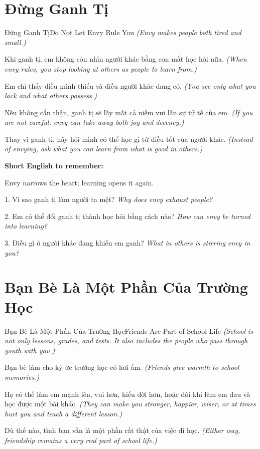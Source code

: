 \section{Đừng Ganh Tị}
\begin{truyen}{Đừng Ganh Tị}{Do Not Let Envy Rule You}
\textit{(Envy makes people both tired and small.)}

Khi ganh tị, em không còn nhìn người khác bằng con mắt học hỏi nữa.
\textit{(When envy rules, you stop looking at others as people to learn from.)}

Em chỉ thấy điều mình thiếu và điều người khác đang có.
\textit{(You see only what you lack and what others possess.)}

Nếu không cẩn thận, ganh tị sẽ lấy mất cả niềm vui lẫn sự tử tế của em.
\textit{(If you are not careful, envy can take away both joy and decency.)}
\end{truyen}

\begin{baihoc}
Thay vì ganh tị, hãy hỏi mình có thể học gì từ điều tốt của người khác.
\textit{(Instead of envying, ask what you can learn from what is good in others.)}
\end{baihoc}

\begin{ghinhoanh}
\textbf{Short English to remember:}

Envy narrows the heart; learning opens it again.

\end{ghinhoanh}

\begin{tuhocnhanh}
1. Vì sao ganh tị làm người ta mệt? \textit{Why does envy exhaust people?}

2. Em có thể đổi ganh tị thành học hỏi bằng cách nào? \textit{How can envy be turned into learning?}

3. Điều gì ở người khác đang khiến em ganh? \textit{What in others is stirring envy in you?}
\end{tuhocnhanh}
\ngancach

\section{Bạn Bè Là Một Phần Của Trường Học}
\begin{truyen}{Bạn Bè Là Một Phần Của Trường Học}{Friends Are Part of School Life}
\textit{(School is not only lessons, grades, and tests. It also includes the people who pass through youth with you.)}

Bạn bè làm cho ký ức trường học có hơi ấm.
\textit{(Friends give warmth to school memories.)}

Họ có thể làm em mạnh lên, vui hơn, hiểu đời hơn, hoặc đôi khi làm em đau và học được một bài khác.
\textit{(They can make you stronger, happier, wiser, or at times hurt you and teach a different lesson.)}

Dù thế nào, tình bạn vẫn là một phần rất thật của việc đi học.
\textit{(Either way, friendship remains a very real part of school life.)}
\end{truyen}

